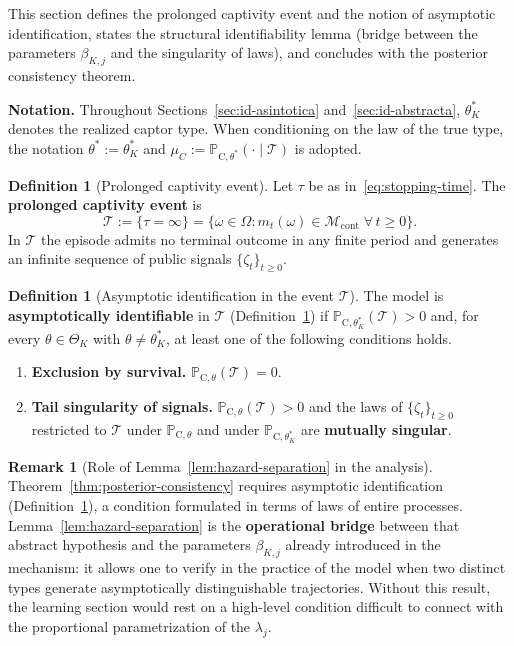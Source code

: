 \documentclass[12pt]{article}
\numberwithin{equation}{section}
\numberwithin{table}{section}
\theoremstyle{definition}
\newtheorem{definition}[theorem]{Definition}
\newtheorem{remark}[theorem]{Remark}
\newcommand{\ProbC}[1]{\mathbb{P}_{\mathrm{C},#1}}
\begin{document}
\noindent This section defines the prolonged captivity event and the notion of
asymptotic identification, states the structural identifiability lemma (bridge
between the parameters $\beta_{K,j}$ and the singularity of laws), and
concludes with the posterior consistency theorem.

\medskip
\noindent\textbf{Notation.}
Throughout Sections~\ref{sec:id-asintotica} and~\ref{sec:id-abstracta},
$\theta_K^\ast$ denotes the realized captor type. When conditioning on the law
of the true type, the notation $\theta^\ast:=\theta_K^\ast$ and
$\mu_C:=\ProbC{\theta^\ast}(\cdot\mid\mathcal{T})$ is adopted.


\begin{definition}[Prolonged captivity event]
\label{def:event-T-long}
Let $\tau$ be as in~\eqref{eq:stopping-time}. The
\textbf{prolonged captivity event} is
\[
\mathcal{T}
:=\{\tau=\infty\}
=\bigl\{\omega\in\Omega:m_t(\omega)\in\mathcal{M}_{\mathrm{cont}}\;\forall\,t\ge 0\bigr\}.
\]
In $\mathcal{T}$ the episode admits no terminal outcome in any finite period
and generates an infinite sequence of public signals
$\{\zeta_t\}_{t\ge 0}$.
\end{definition}

\bigskip

\begin{definition}[Asymptotic identification in the event $\mathcal{T}$]
\label{def:asymptotic-id}
The model is \textbf{asymptotically identifiable} in $\mathcal{T}$
(Definition~\ref{def:event-T-long}) if
$\ProbC{\theta_K^\ast}(\mathcal{T})>0$ and, for every $\theta\in\Theta_K$ with
$\theta\neq\theta_K^\ast$, at least one of the following conditions holds.
\begin{enumerate}
  \item[\textup{(a)}] \textbf{Exclusion by survival.}
  $\ProbC{\theta}(\mathcal{T})=0$.
  \item[\textup{(b)}] \textbf{Tail singularity of signals.}
  $\ProbC{\theta}(\mathcal{T})>0$ and the laws of $\{\zeta_t\}_{t\ge 0}$
  restricted to $\mathcal{T}$ under $\ProbC{\theta}$ and under
  $\ProbC{\theta_K^\ast}$ are \textbf{mutually singular}.
\end{enumerate}
\end{definition}

\begin{remark}[Role of Lemma~\ref{lem:hazard-separation} in the analysis]
Theorem~\ref{thm:posterior-consistency} requires asymptotic identification
(Definition~\ref{def:asymptotic-id}), a condition formulated in terms of
laws of entire processes. Lemma~\ref{lem:hazard-separation} is the
\textbf{operational bridge} between that abstract hypothesis and the
parameters $\beta_{K,j}$ already introduced in the mechanism: it allows one
to verify in the practice of the model when two distinct types generate
asymptotically distinguishable trajectories. Without this result, the learning
section would rest on a high-level condition difficult to connect with the
proportional parametrization of the $\lambda_j$.
\end{remark}
\end{document}
